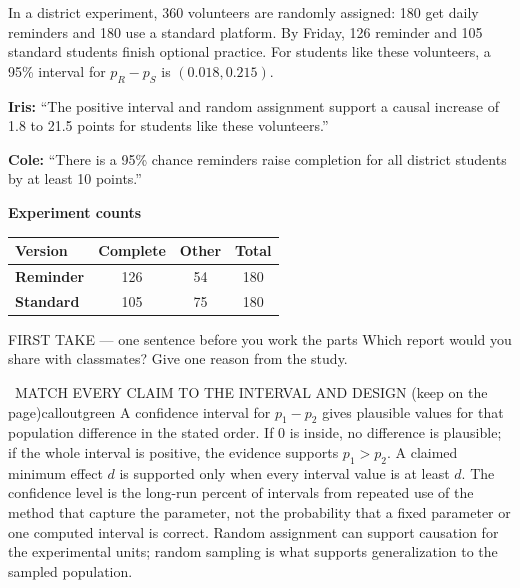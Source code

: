 \documentclass[11pt]{article}
\begin{document}
\clearpage
{}

In a district experiment, 360 volunteers are randomly assigned: 180 get daily reminders and 180 use a standard platform. By Friday, 126 reminder and 105 standard students finish optional practice. For students like these volunteers, a 95\% interval for $p_R-p_S$ is $(0.018,0.215)$.\par\smallskip \textbf{Iris:} ``The positive interval and random assignment support a causal increase of 1.8 to 21.5 points for students like these volunteers.''\par \textbf{Cole:} ``There is a 95\% chance reminders raise completion for all district students by at least 10 points.''\par
\begin{center}
\textbf{Experiment counts}\par\smallskip
\begin{tabular}{|l|c|c|c|}
\hline
\textbf{Version} & \textbf{Complete} & \textbf{Other} & \textbf{Total} \\ \hline
\textbf{Reminder} & 126 & 54 & 180 \\ \hline
\textbf{Standard} & 105 & 75 & 180 \\ \hline
\end{tabular}
\end{center}
\begin{firsttakebox}{FIRST TAKE --- one sentence before you work the parts}
Which report would you share with classmates? Give one reason from the study.\par
{}
\end{firsttakebox}

\begin{callout}{\IconBook\ MATCH EVERY CLAIM TO THE INTERVAL AND DESIGN (keep on the page)}{calloutgreen}
A confidence interval for $p_1-p_2$ gives plausible values for that population difference in the stated order.
If 0 is inside, no difference is plausible; if the whole interval is positive, the evidence supports $p_1>p_2$.
A claimed minimum effect $d$ is supported only when every interval value is at least $d$.
The confidence level is the long-run percent of intervals from repeated use of the method that capture the parameter,
not the probability that a fixed parameter or one computed interval is correct. Random assignment can support causation
for the experimental units; random sampling is what supports generalization to the sampled population.
\end{callout}
\end{document}
